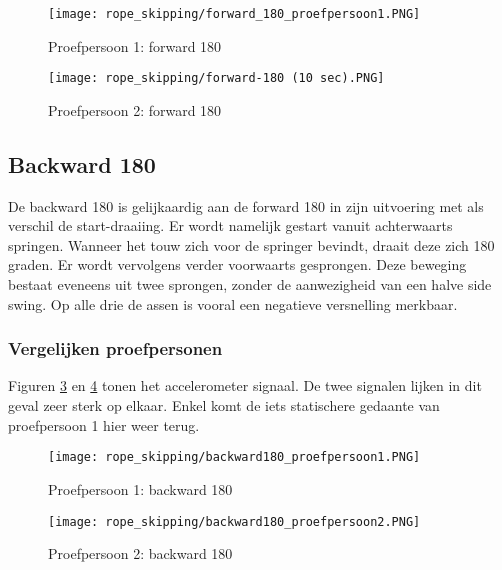 \begin{figure}[!htpd]
\centering
\caption{Proefpersoon 1: forward 180}\label{fig:forward_1801}
\texttt{[image: rope\_skipping/forward\_180\_proefpersoon1.PNG]}
\end{figure}

\begin{figure}[!htpd]
\centering
\caption{Proefpersoon 2: forward 180}\label{fig:forward_1802}
\texttt{[image: rope\_skipping/forward-180 (10 sec).PNG]}
\end{figure}

\subsection{Backward 180}
De backward 180 is gelijkaardig aan de forward 180 in zijn uitvoering met als verschil de start-draaiing. Er wordt namelijk gestart vanuit achterwaarts springen. Wanneer het touw zich voor de springer bevindt, draait deze zich 180 graden. Er wordt vervolgens verder voorwaarts gesprongen. Deze beweging bestaat eveneens uit twee sprongen, zonder de aanwezigheid van een halve side swing. Op alle drie de assen is vooral een negatieve versnelling merkbaar. 

\subsubsection{Vergelijken proefpersonen}
Figuren \ref{fig:backward_1801} en \ref{fig:backward_1802} tonen het accelerometer signaal.
De twee signalen lijken in dit geval zeer sterk op elkaar. Enkel komt de iets statischere gedaante van proefpersoon 1 hier weer terug.

\begin{figure}[!htpd]
\centering
\caption{Proefpersoon 1: backward 180}\label{fig:backward_1801}
\texttt{[image: rope\_skipping/backward180\_proefpersoon1.PNG]}
\end{figure}

\begin{figure}[!htpd]
\centering
\caption{Proefpersoon 2: backward 180}\label{fig:backward_1802}
\texttt{[image: rope\_skipping/backward180\_proefpersoon2.PNG]}
\end{figure}

\begin{figure}[!htpd]
\centering
\begin{floatrow}
\end{floatrow}
\end{figure}

